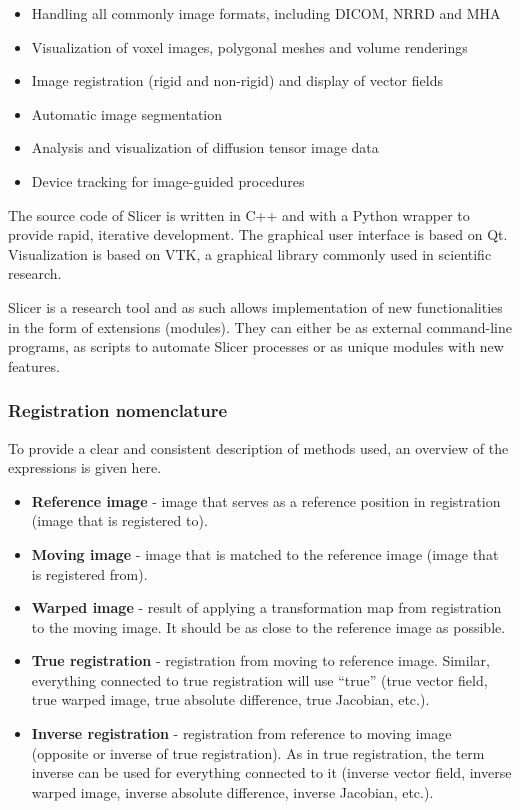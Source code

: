 \documentclass[type=dr, dr=rernat, accentcolor=tud7b,colorbacktitle, bigchapter, openright, twoside, 12pt ]{tudthesis}
\begin{document}
\begin{itemize}
	\item Handling all commonly image formats, including DICOM, NRRD and MHA
	\item Visualization of voxel images, polygonal meshes and volume renderings
	\item Image registration (rigid and non-rigid) and display of vector fields
	\item Automatic image segmentation
	\item Analysis and visualization of diffusion tensor image data
	\item Device tracking for image-guided procedures
\end{itemize}

The source code of Slicer is written in C++ and with a Python wrapper to provide rapid, iterative development. The graphical user interface is based on Qt. Visualization is based on VTK, a graphical library commonly
used in scientific research.

Slicer is a research tool and as such allows implementation of new functionalities in the form of extensions (modules). They can either be as external command-line programs, 
as scripts to automate Slicer processes or as unique modules with new features. 

\subsubsection{Registration nomenclature}

To provide a clear and consistent description of methods used, an overview of the expressions is given here.

\begin{itemize}
 \item \textbf{Reference image} - image that serves as a reference position in registration (image that is registered to).
 \item \textbf{Moving image} - image that is matched to the reference image (image that is registered from).
 \item \textbf{Warped image} - result of applying a transformation map from registration to the moving image. It should be as close to the reference image as possible.
 \item \textbf{True registration} - registration from moving to reference image. Similar, everything connected to true registration will use ``true'' (true vector field, true warped image, true absolute difference, true Jacobian, etc.).
 \item \textbf{Inverse registration} - registration from reference to moving image (opposite or inverse of true registration). As in true registration, the term inverse can be used for everything connected to it (inverse vector field, inverse warped image, inverse absolute difference, inverse Jacobian, etc.).
\end{itemize}
\end{document}
